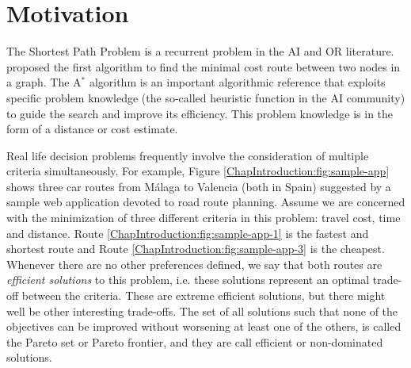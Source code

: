 \section{Motivation}
\label{ChapIntroduction:sec:motivation}

The Shortest Path Problem is a recurrent problem in the AI and OR literature. \citet{dijkstra1959} proposed the first algorithm to find the minimal cost route between two nodes in a graph. The A$^*$ algorithm \citep{Hart1968} is an important algorithmic reference that exploits specific problem knowledge (the so-called heuristic function in the AI community) to guide the search and improve its efficiency. This problem knowledge is in the form of a distance or cost estimate.

Real life decision problems frequently involve the consideration of multiple criteria simultaneously. For example, Figure \ref{ChapIntroduction:fig:sample-app} shows three car routes from M\'{a}laga to Valencia (both in Spain) suggested by a sample web application devoted to road route planning. Assume we are concerned with the minimization of three different criteria in this problem: travel cost, time and distance. Route \ref{ChapIntroduction:fig:sample-app-1} is the fastest and shortest route and Route \ref{ChapIntroduction:fig:sample-app-3} is the cheapest. Whenever there are no other preferences defined, we say that both routes are \emph{efficient solutions} to this problem, i.e. these solutions represent an optimal trade-off between the criteria. These are extreme efficient solutions, but there might well be other interesting trade-offs. The set of all solutions such that none of the objectives can be improved without worsening at least one of the others, is called the Pareto set or Pareto frontier, and they are call efficient or non-dominated solutions.

